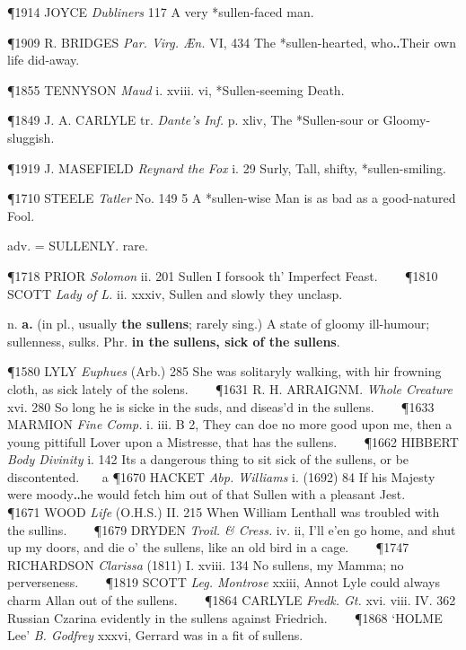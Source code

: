 \begin{description}[wide, labelwidth=!, labelindent=0pt]
\begin{myenumerate}
\P 1914 JOYCE  \textit{Dubliners} 117 A very *sullen-faced man.

\P 1909 R. BRIDGES  \textit{Par. Virg. Æn.} VI, 434 The *sullen-hearted, who‥Their own life did-away.

\P 1855 TENNYSON  \textit{Maud} i. xviii. vi, *Sullen-seeming Death.

\P 1849 J. A. CARLYLE  tr. \textit{Dante's Inf.} p. xliv, The *Sullen-sour or Gloomy-sluggish.

\P 1919 J. MASEFIELD  \textit{Reynard the Fox} i. 29 Surly, Tall, shifty, *sullen-smiling.

\P 1710 STEELE  \textit{Tatler} No. 149 5 A *sullen-wise Man is as bad as a good-natured Fool.

 adv. = SULLENLY. rare.

\P 1718 PRIOR  \textit{Solomon} ii. 201 Sullen I forsook th' Imperfect Feast.    
\P 1810 SCOTT  \textit{Lady of L.} ii. xxxiv, Sullen and slowly they unclasp.

 n. \textbf{a.} (in pl., usually \textbf{the sullens}; rarely sing.) A state of gloomy ill-humour; sullenness, sulks. Phr. \textbf{in the sullens, sick of the sullens}.

\P 1580 LYLY  \textit{Euphues} (Arb.) 285 She was solitaryly walking, with hir frowning cloth, as sick lately of the solens.    
\P 1631 R. H. ARRAIGNM.  \textit{Whole Creature} xvi. 280 So long he is sicke in the suds, and diseas'd in the sullens.    
\P 1633 MARMION  \textit{Fine Comp.} i. iii. B 2, They can doe no more good upon me, then a young pittifull Lover upon a Mistresse, that has the sullens.    
\P 1662 HIBBERT  \textit{Body Divinity} i. 142 Its a dangerous thing to sit sick of the sullens, or be discontented.    a 
\P 1670 HACKET  \textit{Abp. Williams} i. (1692) 84 If his Majesty were moody‥he would fetch him out of that Sullen with a pleasant Jest.    
\P 1671 WOOD  \textit{Life} (O.H.S.) II. 215 When William Lenthall was troubled with the sullins.    
\P 1679 DRYDEN  \textit{Troil. \& Cress.} iv. ii, I'll e'en go home, and shut up my doors, and die o' the sullens, like an old bird in a cage.    
\P 1747 RICHARDSON  \textit{Clarissa} (1811) I. xviii. 134 No sullens, my Mamma; no perverseness.    
\P 1819 SCOTT  \textit{Leg. Montrose} xxiii, Annot Lyle could always charm Allan out of the sullens.    
\P 1864 CARLYLE  \textit{Fredk. Gt.} xvi. viii. IV. 362 Russian Czarina evidently in the sullens against Friedrich.    
\P 1868 ‘HOLME  Lee’ \textit{B. Godfrey} xxxvi, Gerrard was in a fit of sullens.


\end{myenumerate}
\end{description}
